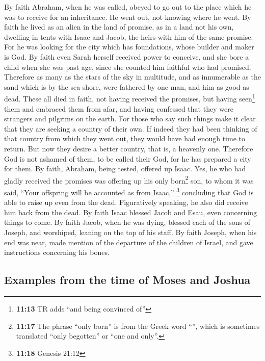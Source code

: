  By faith Abraham, when he was called, obeyed to go out to
the place which he was to receive for an inheritance. He went out, not
knowing where he went.  By faith he lived as an alien in
the land of promise, as in a land not his own, dwelling in tents with
Isaac and Jacob, the heirs with him of the same promise. 
For he was looking for the city which has foundations, whose builder and
maker is God.  By faith even Sarah herself received power
to conceive, and she bore a child when she was past age, since she
counted him faithful who had promised.  Therefore as many
as the stars of the sky in multitude, and as innumerable as the sand
which is by the sea shore, were fathered by one man, and him as good as
dead.  These all died in faith, not having received the
promises, but having seen\footnote{\textbf{11:13} TR adds ``and being
  convinced of''} them and embraced them from afar, and having confessed
that they were strangers and pilgrims on the earth.  For
those who say such things make it clear that they are seeking a country
of their own.  If indeed they had been thinking of that
country from which they went out, they would have had enough time to
return.  But now they desire a better country, that is, a
heavenly one. Therefore God is not ashamed of them, to be called their
God, for he has prepared a city for them.  By faith,
Abraham, being tested, offered up Isaac. Yes, he who had gladly received
the promises was offering up his only born\footnote{\textbf{11:17} The
  phrase ``only born'' is from the Greek word ``'',
  which is sometimes translated ``only begotten'' or ``one and only''.}
son,  to whom it was said, ``Your offspring will be
accounted as from Isaac,'' \footnote{\textbf{11:18} Genesis 21:12}
 concluding that God is able to raise up even from the
dead. Figuratively speaking, he also did receive him back from the dead.
 By faith Isaac blessed Jacob and Esau, even concerning
things to come.  By faith Jacob, when he was dying,
blessed each of the sons of Joseph, and worshiped, leaning on the top of
his staff.  By faith Joseph, when his end was near, made
mention of the departure of the children of Israel, and gave
instructions concerning his bones.

\hypertarget{examples-from-the-time-of-moses-and-joshua}{%
\subsection{Examples from the time of Moses and
Joshua}\label{examples-from-the-time-of-moses-and-joshua}}

